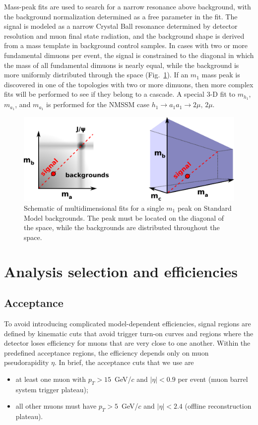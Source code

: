 \documentclass[12pt]{cms-tdr}
\begin{document}
Mass-peak fits are used to search for a narrow resonance above
background, with the background normalization determined as a free
parameter in the fit.  The signal is modeled as a narrow Crystal Ball
resonance determined by detector resolution and muon final state
radiation, and the background shape is derived from a mass template in
background control samples.  In cases with two or more fundamental
dimuons per event, the signal is constrained to the diagonal in which
the mass of all fundamental dimuons is nearly equal, while the
background is more uniformly distributed through the space
(Fig.~\ref{fig:diagonal}).  If an $m_1$ mass peak is discovered in one
of the topologies with two or more dimuons, then more complex fits
will be performed to see if they belong to a cascade.  A special 3-D
fit to $m_{h_1}$, $m_{a_1}$, and $m_{a_1}$ is performed for the NMSSM
case $h_1 \to a_1 a_1 \to 2\mu, \, 2\mu$.

\begin{figure}
\begin{center}
\includegraphics[width=0.75\linewidth]{PLOTS/diagonal.pdf}
\end{center}

\caption{Schematic of multidimensional fits for a single $m_1$ peak
  on Standard Model backgrounds.  The peak must be located on the
  diagonal of the space, while the backgrounds are distributed
  throughout the space. \label{fig:diagonal}}
\end{figure}

\section{Analysis selection and efficiencies}

\subsection{Acceptance}

To avoid introducing complicated model-dependent efficiencies, signal
regions are defined by kinematic cuts that avoid trigger turn-on
curves and regions where the detector loses efficiency for muons that
are very close to one another.  Within the predefined acceptance
regions, the efficiency depends only on muon pseudorapidity $\eta$.
In brief, the acceptance cuts that we use are
\begin{itemize}
\item at least one muon with $p_T > 15$~GeV/$c$ and $|\eta| < 0.9$ per
  event (muon barrel system trigger plateau);
\item all other muons must have $p_T > 5$~GeV/$c$ and $|\eta| < 2.4$
  (offline reconstruction plateau).
\end{itemize}
\end{document}
